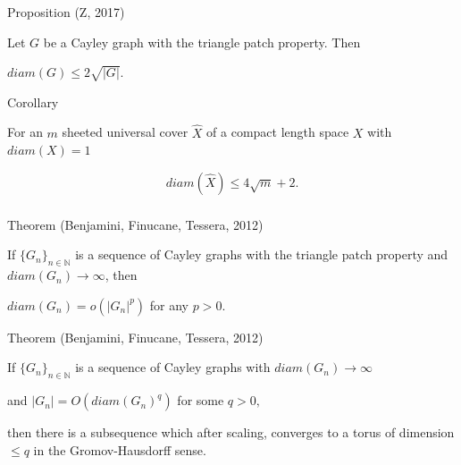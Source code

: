 \documentclass{beamer}
\begin{document}
\begin{frame}\frametitle{}



\begin{block}{Proposition (Z, 2017)}
{Let $G$ be a Cayley graph with the triangle patch property. Then 
\begin{center}
$diam(G) \leq 2 \sqrt{\vert G \vert}.$
\end{center}

 }
\end{block}
\begin{block}{Corollary}
{For an $m$ sheeted universal cover $\hat{X}$ of a compact length space $X$ with $diam(X)=1$

$$diam (\hat{X}) \leq 4 \sqrt{m}+2. $$
 }
 \end{block}



\end{frame}




\begin{frame}\frametitle{}



\begin{block}{Theorem (Benjamini, Finucane, Tessera, 2012)}
{If $\{  G_n \}_{n \in \mathbb{N}}$ is a sequence of Cayley graphs with the triangle patch property and $diam(G_n) \rightarrow \infty$, then
\begin{center}
$diam (G_n) = o( \vert G_n \vert ^p ) $ for any $p>0$.
\end{center}
 
 }
\end{block}


\pause



\begin{block}{Theorem (Benjamini, Finucane, Tessera, 2012)}
{If $\{  G_n \}_{n \in \mathbb{N}}$ is a sequence of Cayley graphs with $diam(G_n) \rightarrow \infty$
\begin{center}
and $ \vert G_n \vert = O(   diam (G_n)^q ) $ for some $q>0,$
\end{center} then there is a subsequence which after scaling, converges to a torus of dimension $\leq q$ in the Gromov-Hausdorff sense.
 }
\end{block}


\end{frame}

\end{document}
